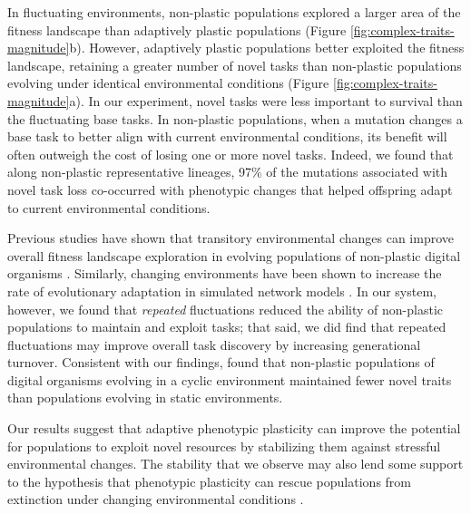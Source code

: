 In fluctuating environments, non-plastic populations explored a larger area of the fitness landscape than adaptively plastic populations (Figure \ref{fig:complex-traits-magnitude}b).
However, adaptively plastic populations better exploited the fitness landscape, retaining a greater number of novel tasks than non-plastic populations evolving under identical environmental conditions (Figure \ref{fig:complex-traits-magnitude}a).
In our experiment, novel tasks were less important to survival than the fluctuating base tasks.
In non-plastic populations, when a mutation changes a base task to better align with current environmental conditions, its benefit will often outweigh the cost of losing one or more novel tasks. 
Indeed, we found that along non-plastic representative lineages, 97\% of the mutations associated with novel task loss co-occurred with phenotypic changes that helped offspring adapt to current environmental conditions. 

Previous studies have shown that transitory environmental changes can improve overall fitness landscape exploration in evolving populations of non-plastic digital organisms \citep{nahum_improved_2017}.
Similarly, changing environments have been shown to increase the rate of evolutionary adaptation in simulated network models \citep{kashtan2007varying}.
In our system, however, we found that \textit{repeated} fluctuations reduced the ability of non-plastic populations to maintain and exploit tasks; that said, we did find that repeated fluctuations may improve overall task discovery by increasing generational turnover. 
Consistent with our findings, \cite{canino-koning_fluctuating_2019} found that non-plastic populations of digital organisms evolving in a cyclic environment maintained fewer novel traits than populations evolving in static environments.

Our results suggest that adaptive phenotypic plasticity can improve the potential for populations to exploit novel resources by stabilizing them against stressful environmental changes.
The stability that we observe may also lend some support to the hypothesis that phenotypic plasticity can rescue populations from extinction under changing environmental conditions \citep{chevin_adaptation_2010}.

